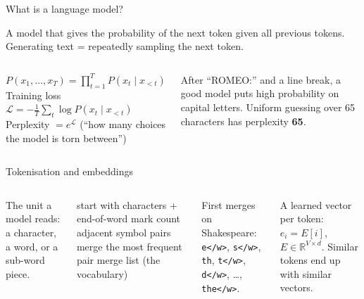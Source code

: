 \documentclass[aspectratio=169,11pt]{beamer}
\begin{document}

\begin{frame}{What is a language model?}
\begin{bdef}
A model that gives the probability of the next token given all previous tokens. Generating text = repeatedly sampling the next token.
\end{bdef}
\begin{columns}[T]
\begin{bmath}
$P(x_1,\dots,x_T)=\prod_{t=1}^{T}P(x_t\mid x_{<t})$\\[3pt]
Training loss $\mathcal{L}=-\frac1T\sum_t\log P(x_t\mid x_{<t})$\\[3pt]
Perplexity $=e^{\mathcal{L}}$ (``how many choices the model is torn between'')
\end{bmath}
\begin{bex}[Example]
After ``ROMEO:'' and a line break, a good model puts high probability on capital letters. Uniform guessing over 65 characters has perplexity \textbf{65}.
\end{bex}
\end{columns}
\end{frame}

\begin{frame}{Tokenisation and embeddings}
\begin{columns}[T]
\begin{bdef}[Token]
The unit a model reads: a character, a word, or a sub-word piece.
\end{bdef}
\begin{balgo}
\begin{algorithmic}[1]
\State start with characters + end-of-word mark
  \State count adjacent symbol pairs
  \State merge the most frequent pair
\EndFor
\State \Return merge list (the vocabulary)
\end{algorithmic}
\end{balgo}
\begin{bres}
First merges on Shakespeare: \texttt{e</w>}, \texttt{s</w>}, \texttt{th}, \texttt{t</w>}, \texttt{d</w>}, \ldots, \texttt{the</w>}.
\end{bres}
\begin{bdef}[Embedding]
A learned vector per token: $e_i=E[i]$, $E\in\mathbb{R}^{V\times d}$. Similar tokens end up with similar vectors.
\end{bdef}
\end{columns}
\end{frame}
\end{document}
